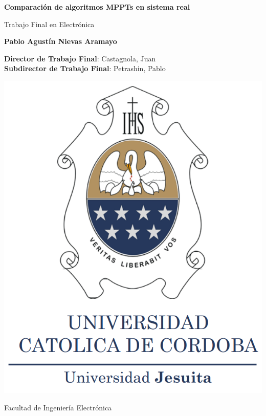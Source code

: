 \begin{titlepage}
\begin{center}
\LARGE
\textbf{Comparación de algoritmos MPPTs en sistema real}

\vspace{0.4cm}
Trabajo Final en Electrónica

\vspace{0.5cm}
\textbf{Pablo Agustín Nievas Aramayo}

\vspace{0.3cm}
\small
\textbf{Director de Trabajo Final}: Castagnola, Juan\\
\textbf{Subdirector de Trabajo Final}: Petrashin, Pablo

\vspace{0.4cm}

\includegraphics[scale=0.5]{imagenes/FacuIcon.png}

\Large
Facultad de Ingeniería Electrónica\\
\end{center}
\end{titlepage}